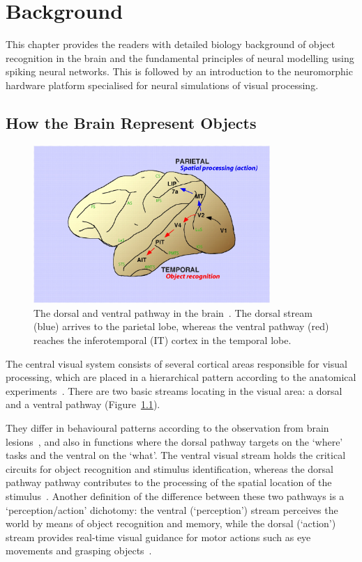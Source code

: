 \chapter{Background}
\label{cha:bkg}
This chapter provides the readers with detailed biology background of object recognition in the brain and the fundamental principles of neural modelling using spiking neural networks.
This is followed by an introduction to the neuromorphic hardware platform specialised for neural simulations of visual processing.

\section{How the Brain Represent Objects}
\label{sec:bio}

\begin{figure}
	\centering
	\includegraphics[width=0.8\textwidth]{pics/twoPaths.jpg}
	\caption{The dorsal and ventral pathway in the brain~\cite{lehky2007comparison}.
	The dorsal stream (blue) arrives to the parietal lobe, whereas the ventral pathway (red) reaches the inferotemporal (IT) cortex in the temporal lobe.}
	\label{Fig:TwoPath}
\end{figure}
The central visual system consists of several cortical areas responsible for visual processing, which are placed in a hierarchical pattern according to the anatomical experiments~\cite{felleman1991distributed}.
There are two basic streams locating in the visual area: a dorsal and a ventral pathway (Figure~\ref{Fig:TwoPath}).

They differ in behavioural patterns according to the observation from brain lesions~\cite{prado2005two}, and also in functions where the dorsal pathway targets on the `where' tasks and the ventral on the `what'.
The ventral visual stream holds the critical circuits for object recognition and stimulus identification, whereas the dorsal pathway pathway contributes to the processing of the spatial location of the stimulus~\cite{prado2005two, Ungerleider1994157}.
Another definition of the difference between these two pathways is a `perception/action' dichotomy: the ventral (`perception') stream perceives the world by means of object recognition and memory, while the dorsal (`action') stream provides real-time visual guidance for motor actions such as eye movements and grasping objects~\cite{goodale1992separate}. 

